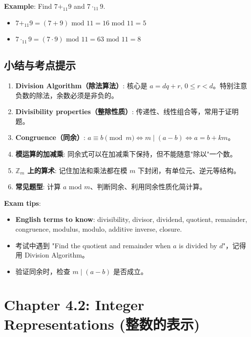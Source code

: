 \documentclass[10pt,a4paper,openany]{ctexbook}
\theoremstyle{definition}
\theoremstyle{remark}
\begin{document}
\textbf{Example}: Find $7 +_{11} 9$ and $7 \cdot_{11} 9$.
\begin{itemize}
\item $7 +_{11} 9 = (7 + 9) \text{ mod } 11 = 16 \text{ mod } 11 = 5$
\item $7 \cdot_{11} 9 = (7 \cdot 9) \text{ mod } 11 = 63 \text{ mod } 11 = 8$

\end{itemize}

\vspace{-2pt}

\subsection{小结与考点提示}

\begin{enumerate}
\item \textbf{Division Algorithm（除法算法）}: 核心是 $a = dq + r$, $0 \le r < d$。特别注意负数的除法，余数必须是非负的。
\item \textbf{Divisibility properties（整除性质）}: 传递性、线性组合等，常用于证明题。
\item \textbf{Congruence（同余）}: $a \equiv b \pmod{m} \iff m \mid (a - b) \iff a = b + km$。
\item \textbf{模运算的加减乘}: 同余式可以在加减乘下保持，但不能随意"除以"一个数。
\item \textbf{$\mathbb{Z}_m$ 上的算术}: 记住加法和乘法都在模 $m$ 下封闭，有单位元、逆元等结构。
\item \textbf{常见题型}: 计算 $a \text{ mod } m$、判断同余、利用同余性质化简计算。

\end{enumerate}

\textbf{Exam tips}:
\begin{itemize}
\item \textbf{English terms to know}: divisibility, divisor, dividend, quotient, remainder, congruence, modulus, modulo, additive inverse, closure.
\item 考试中遇到 "Find the quotient and remainder when $a$ is divided by $d$"，记得用 Division Algorithm。
\item 验证同余时，检查 $m \mid (a - b)$ 是否成立。

\end{itemize}

\newpage

\section{Chapter 4.2: Integer Representations (整数的表示)}
\end{document}
